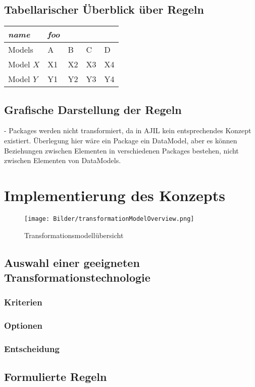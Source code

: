 \documentclass[
	oneside,  %
	ngerman, 
	final, 
	11pt, 
	a4paper, 
	1.1headlines, 
	headinclude=false, 
	footinclude=false, 
	mpinclude=false, 
	pagesize, 
	onecolumn, 
	titlepage, 
	parskip=half, 
	headsepline, 
	chapterprefix=false, 
	version=first, 
	listof=totoc, 
	bibliography=totoc, 
	toc=graduated, 
	fleqn
]{scrbook}
\begin{document}
\section{Tabellarischer Überblick über Regeln}
\begin{tabular}{*5l}    \toprule
\emph{name} & \emph{foo} &&&  \\\midrule
Models    & A  & B  & C  & D  \\ 
 Model $X$ & X1 & X2 & X3 & X4\\ 
 Model $Y$ & Y1 & Y2 & Y3 & Y4\\\bottomrule
 \hline
\end{tabular}

\section{Grafische Darstellung der Regeln}


- Packages werden nicht transformiert, da in AJIL kein entsprechendes Konzept existiert. Überlegung hier wäre ein Package ein DataModel, aber es können Beziehungen zwischen Elementen in verschiedenen Packages bestehen, nicht zwischen Elementen von DataModels.

\chapter{Implementierung des Konzepts}
\begin{figure}
\texttt{[image: Bilder/transformationModelOverview.png]}
\caption{Transformationsmodellübersicht}
\end{figure}
\section{Auswahl einer geeigneten Transformationstechnologie}
\subsection{Kriterien}
\subsection{Optionen}
\subsection{Entscheidung}
\section{Formulierte Regeln}
\end{document}
